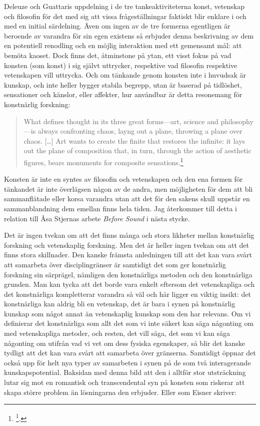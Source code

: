 \documentclass[11pt]{article}
\begin{document}
Deleuze och Guattaris uppdelning i de tre tankeaktiviteterna konst,
vetenskap och filosofin för det med sig att vissa frågeställningar
faktiskt blir enklare i och med en initial särdelning. Även om ingen av
de tre formerna egentligen är beroende av varandra för sin egen existens
så erbjuder denna beskrivning av dem en potentiell renodling och en
möjlig interaktion med ett gemensamt mål: att bemöta kaoset. Dock finns
det, åtminstone på ytan, ett visst fokus på vad konsten (som konst) i
sig självt uttrycker, respektive vad filosofin respektive vetenskapen
vill uttrycka. Och om tänkande genom konsten inte i huvudsak är kunskap,
och inte heller bygger stabila begrepp, utan är baserad på tidlöshet,
sensationer och känslor, eller affekter, hur användbar är detta
resonemang för konstnärlig forskning:

\begin{quote}
What defines thought in its three great forms---art, science and
philosophy---is always confronting chaos, layng out a plane, throwing
a plane over chaos. [\ldots{}] Art wants to create the finite that restores
the infinite: it lays out the plane of composition that, in turn,
through the action of aesthetic figures, bears monuments for composite
sensations.\footnote{\footcite[s.197]{deleuze1994}.}
\end{quote}

Konsten är inte en syntes av filosofin och vetenskapen och den ena
formen för tänkandet är inte överlägsen någon av de andra, men
möjligheten för dem att bli sammanflätade eller korsa varandra utan att
det för den sakens skull uppstår en sammanblandning dem emellan finns
hela tiden. Jag återkommer till detta i relation till Åsa Stjernas
arbete \emph{Before Sound} i nästa stycke.

Det är ingen tvekan om att det finns många och stora likheter mellan
konstnärlig forskning och vetenskaplig forskning. Men det är heller
ingen tvekan om att det finns stora skillnader. Den kanske främsta
anledningen till att det kan vara svårt att samarbeta över
disciplingränser är samtidigt det som ger konstnärlig forskning sin
särprägel, nämligen den konstnärliga metoden och den konstnärliga
grunden. Man kan tycka att det borde vara enkelt eftersom det
vetenskapliga och det konstnärliga kompletterar varandra så väl och här
ligger en viktig insikt: det konstnärliga kan aldrig bli en vetenskap,
det är bara i synen på konstnärlig kunskap som något annat än
vetenskaplig kunskap som den har relevans. Om vi definierar det
konstnärliga som allt det som vi inte säkert kan säga någonting om med
vetenskapliga metoder, och resten, det vill säga, det som vi kan säga
någonting om utifrån vad vi vet om dess fysiska egenskaper, så blir det
kanske tydligt att det kan vara svårt att samarbeta över gränserna.
Samtidigt öppnar det också upp för helt nya typer av samarbeten i synen
på de som två interagerande kunskapspotential. Baksidan med denna bild
att den i alltför stor utsträckning lutar sig mot en romantisk och
transcendental syn på konsten som riskerar att skapa större problem än
lösningarna den erbjuder. Eller som Eisner skriver:
\end{document}
